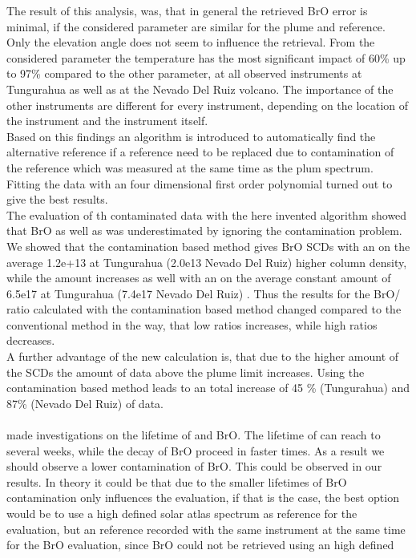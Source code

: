 \documentclass  [
  paper    = a4,
  BCOR     = 10mm,
  twoside,
  fontsize = 12pt,
  fleqn,
  toc      = bibnumbered,
  toc      = listofnumbered,
  numbers  = noendperiod,
  headings = normal,
  listof   = leveldown,
  version  = 3.03
]                                       {scrreprt}
\begin{document}
	The result of this analysis, was, that in general the retrieved BrO error is minimal, if the considered parameter are similar for the plume and reference. Only the elevation angle does not seem to influence the retrieval. From the considered parameter the temperature has the most significant impact of 60\% up to 97\% compared to the other parameter, at all observed instruments at Tungurahua as well as at the Nevado Del Ruiz volcano. The importance of the other instruments are different for every instrument, depending on the location of the instrument and the instrument itself.\\
	Based on this findings an algorithm is introduced to automatically find the alternative reference if a reference need to be replaced due to contamination of the reference which was measured at the same time as the plum spectrum.\\
	Fitting the data with an four dimensional first order polynomial turned out to give the best results.\\
	The evaluation of th contaminated data with the here invented algorithm showed that BrO as well as  was underestimated by ignoring the contamination problem.
	We showed that the contamination based method gives BrO SCDs with an on the average 1.2e+13 at Tungurahua (2.0e13 Nevado Del Ruiz) higher column density, while the  amount increases as well with an on the average constant amount of 6.5e17 at Tungurahua (7.4e17 Nevado Del Ruiz) . Thus the results for the BrO/ ratio calculated with the contamination based method changed compared to the conventional method in the way, that low ratios increases, while high ratios decreases.\\
	A further advantage of the new calculation is, that due to the higher amount of the  SCDs the amount of data above the plume limit increases. Using the contamination based method leads to an total increase of 45 \% (Tungurahua) and 87\% (Nevado Del Ruiz) of data.\\
	\\	
	\cite{geeignete quelle, irgendwo hab ich das schon gehoert} made investigations on the lifetime of  and BrO. The lifetime of  can reach to several weeks, while the decay of BrO proceed in faster times. As a result we should observe a lower contamination of BrO. This could be observed in our results. In theory it could be that due to the smaller lifetimes of BrO contamination only influences the  evaluation, if that is the case, the best option would be to use a high defined solar atlas spectrum as reference for the  evaluation, but an reference recorded with the same instrument at the same time for the BrO evaluation, since BrO could not be retrieved using an high defined 
\end{document}
